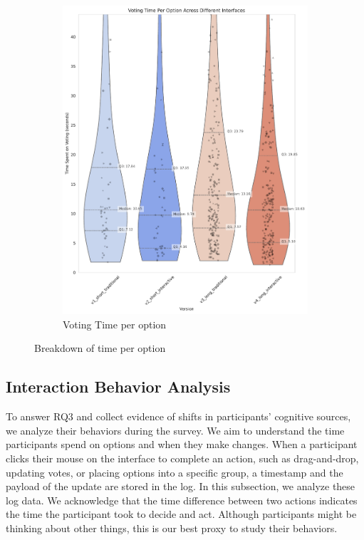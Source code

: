 {\begin{landscape}
\begin{figure}[ht]
\begin{subfigure}[b]{0.26\pdfpageheight}
            \includegraphics[width=\textwidth]{content/image/results/voting_time_per_option.pdf}
            \caption{Voting Time per option}
            \label{fig:vote_time}
        \end{subfigure}
        \caption{Breakdown of time per option}
        \label{fig:Time Spent Per Option Per Person}
    \end{figure}
\end{landscape}
}

\subsection{Interaction Behavior Analysis}
To answer RQ3 and collect evidence of shifts in participants' cognitive sources, we analyze their behaviors during the survey. We aim to understand the time participants spend on options and when they make changes. When a participant clicks their mouse on the interface to complete an action, such as drag-and-drop, updating votes, or placing options into a specific group, a timestamp and the payload of the update are stored in the log. In this subsection, we analyze these log data. We acknowledge that the time difference between two actions indicates the time the participant took to decide and act. Although participants might be thinking about other things, this is our best proxy to study their behaviors.



